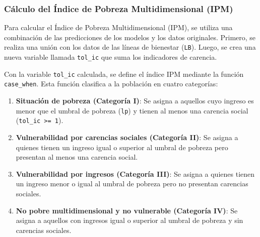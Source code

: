 \documentclass[
  12pt,
]{book}
\providecommand{\tightlist}{%
  \setlength{\itemsep}{0pt}\setlength{\parskip}{0pt}}
\begin{document}
\hypertarget{cuxe1lculo-del-uxedndice-de-pobreza-multidimensional-ipm}{%
\subsubsection*{Cálculo del Índice de Pobreza Multidimensional (IPM)}\label{cuxe1lculo-del-uxedndice-de-pobreza-multidimensional-ipm}}

Para calcular el Índice de Pobreza Multidimensional (IPM), se utiliza una combinación de las predicciones de los modelos y los datos originales. Primero, se realiza una unión con los datos de las líneas de bienestar (\texttt{LB}). Luego, se crea una nueva variable llamada \texttt{tol\_ic} que suma los indicadores de carencia.

Con la variable \texttt{tol\_ic} calculada, se define el índice IPM mediante la función \texttt{case\_when}. Esta función clasifica a la población en cuatro categorías:

\begin{enumerate}
\def\labelenumi{\arabic{enumi}.}
\tightlist
\item
  \textbf{Situación de pobreza (Categoría I)}: Se asigna a aquellos cuyo ingreso es menor que el umbral de pobreza (\texttt{lp}) y tienen al menos una carencia social (\texttt{tol\_ic\ \textgreater{}=\ 1}).
\item
  \textbf{Vulnerabilidad por carencias sociales (Categoría II)}: Se asigna a quienes tienen un ingreso igual o superior al umbral de pobreza pero presentan al menos una carencia social.
\item
  \textbf{Vulnerabilidad por ingresos (Categoría III)}: Se asigna a quienes tienen un ingreso menor o igual al umbral de pobreza pero no presentan carencias sociales.
\item
  \textbf{No pobre multidimensional y no vulnerable (Categoría IV)}: Se asigna a aquellos con ingresos igual o superior al umbral de pobreza y sin carencias sociales.
\end{enumerate}
\end{document}
